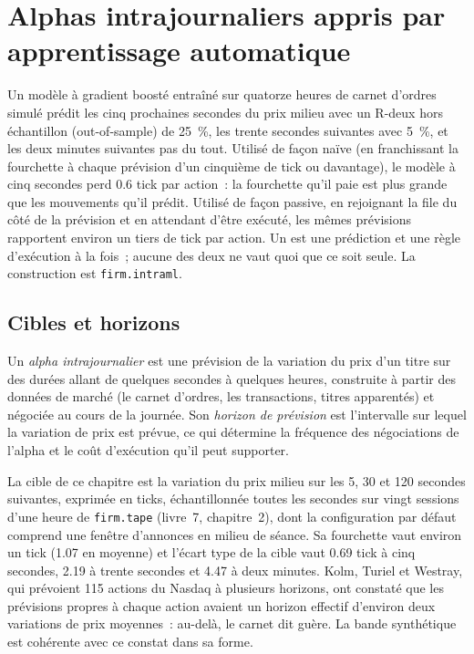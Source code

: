 \chapter{Alphas intrajournaliers appris par apprentissage automatique}\label{ch:s1:intraday-machine-learned-alphas}

Un modèle à gradient boosté entraîné sur quatorze heures de carnet d'ordres simulé prédit les cinq prochaines secondes du prix milieu avec un R-deux
hors échantillon (out-of-sample) de 25~\%, les trente secondes suivantes avec 5~\%, et les deux minutes suivantes pas du tout. Utilisé de façon naïve (en franchissant la fourchette à chaque prévision d'un cinquième
de tick ou davantage), le modèle à cinq secondes perd 0.6 tick par action~: la fourchette qu'il paie est plus grande que les mouvements qu'il prédit. Utilisé de façon passive, en rejoignant la
file du côté de la prévision et en attendant d'être exécuté, les mêmes prévisions rapportent environ un tiers de tick par action. Un  est une prédiction et une
règle d'exécution à la fois~; aucune des deux ne vaut quoi que ce soit seule. La construction est \texttt{firm.intraml}.

\section{Cibles et horizons}

\begin{definition}\label{def:s1:intraday-machine-learned-alphas:alpha}
Un \emph{alpha intrajournalier} est une prévision de la variation du prix d'un titre sur des durées allant de quelques secondes à quelques heures, construite à partir des données de marché (le carnet d'ordres, les
transactions, titres apparentés) et négociée au cours de la journée. Son \emph{horizon de prévision} est l'intervalle sur lequel la variation de prix est prévue, ce qui
détermine la fréquence des négociations de l'alpha et le coût d'exécution qu'il peut supporter.
\end{definition}

La cible de ce chapitre est la variation du prix milieu sur les 5, 30 et 120 secondes suivantes, exprimée en ticks, échantillonnée toutes les secondes sur vingt sessions d'une heure de
\texttt{firm.tape} (livre~7, chapitre~2), dont la configuration par défaut comprend une fenêtre d'annonces en milieu de séance. Sa fourchette vaut environ un tick (1.07 en moyenne) et
l'écart type de la cible vaut 0.69 tick à cinq secondes, 2.19 à trente secondes et 4.47 à deux minutes. Kolm, Turiel et Westray, qui prévoient 115 actions du Nasdaq
à plusieurs horizons, ont constaté que les prévisions propres à chaque action avaient un horizon effectif d'environ deux variations de prix moyennes~: au-delà, le carnet dit
guère. La bande synthétique est cohérente avec ce constat dans sa forme.

